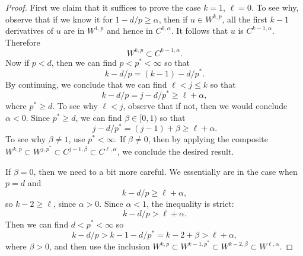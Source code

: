 \documentclass{amsart}
\begin{document}
\begin{proof}
  First we claim that it suffices to prove the case $k=1$, $\ell=0$. To see why, observe that if we know it for $1-d/p\ge \alpha$, then if $u\in W^{k,p}$, all the first $k-1$ derivatives of $u$ are in $W^{1,p}$ and hence in $C^{0,\alpha}$. It follows that $u$ is $C^{k-1,\alpha}$. Therefore
  \begin{equation*}
    W^{k,p}\subset C^{k-1,\alpha}.
  \end{equation*}
  Now if $p<d$, then we can find $p<p^{*}<\infty$ so that
  \begin{equation*}
    k-d/p=(k-1)-d/p^{*}.
  \end{equation*}
  By continuing, we conclude that we can find $\ell <j\le k$ so that
  \begin{equation*}
    k-d/p=j-d/p^{*}\ge \ell+\alpha,
  \end{equation*}
  where $p^{*}\ge d$. To see why $\ell<j$, observe that if not, then we would conclude $\alpha<0$. Since $p^{*}\ge d$, we can find $\beta\in [0,1)$ so that
  \begin{equation*}
    j-d/p^{*}=(j-1)+\beta\ge \ell+\alpha.
  \end{equation*}
  To see why $\beta\ne 1$, use $p^{*}<\infty$. If $\beta\ne 0$, then by applying the composite $W^{k,p}\subset W^{j,p^{*}}\subset C^{j-1,\beta}\subset C^{\ell,\alpha}$, we conclude the desired result.

  If $\beta=0$, then we need to a bit more careful. We essentially are in the case when $p=d$ and
  \begin{equation*}
   k-d/p\ge \ell+\alpha, 
 \end{equation*}
 so $k-2\ge \ell$, since $\alpha>0$. Since $\alpha<1$, the inequality is strict:
 \begin{equation*}
   k-d/p>\ell+\alpha.
 \end{equation*}
 Then we can find $d<p^{*}<\infty$ so
 \begin{equation*}
   k-d/p>k-1-d/p^{*}=k-2+\beta>\ell+\alpha,
 \end{equation*}
 where $\beta>0$, and then use the inclusion $W^{k,p}\subset W^{k-1,p^{*}}\subset W^{k-2,\beta}\subset W^{\ell,\alpha}$.
 

\end{proof}
\end{document}
